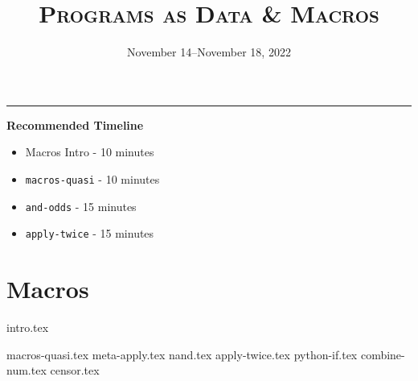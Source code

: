 \documentclass{exam}
\title{\textsc{Programs as Data \& Macros}}
\date{November 14--November 18, 2022}
\begin{document}
\maketitle
\rule{\textwidth}{0.15em}

\begin{guide}
\begin{blocksection}
    \textbf{Recommended Timeline}
    \begin{itemize}
        \item Macros Intro - 10 minutes
        \item \lstinline{macros-quasi} - 10 minutes
        \item \lstinline{and-odds} - 15 minutes
        \item \lstinline{apply-twice} - 15 minutes
    \end{itemize}
\end{blocksection}
\newpage
\end{guide}

\section{Macros}
{intro.tex}
\begin{questions}
{macros-quasi.tex}
{meta-apply.tex}
{nand.tex}
{apply-twice.tex}
{python-if.tex}
{combine-num.tex}
{censor.tex}
\end{questions}
\end{document}
